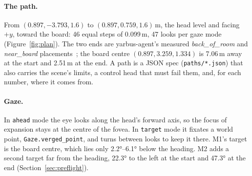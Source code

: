 \documentclass[11pt,a4paper]{article}
\newcommand{\code}[1]{\texttt{\small #1}}
\begin{document}
\paragraph{The path.} From $(0.897,-3.793,1.6)$ to $(0.897,0.759,1.6)$\,m, the head level and facing $+y$, toward the
board: 46 equal steps of 0.099\,m, 47 looks per gaze mode (Figure~\ref{fig:plan}). The two ends are yarbus-agent's
measured \emph{back\_of\_room} and \emph{near\_board} placements~\cite{yarbus}; the board centre $(0.897,3.259,1.334)$ is
7.06\,m away at the start and 2.51\,m at the end. A path is a JSON spec (\code{paths/*.json}) that also carries the
scene's limits, a control head that must fail them, and, for each number, where it comes from.

\paragraph{Gaze.} In \code{ahead} mode the eye looks along the head's forward axis, so the focus of expansion stays at the
centre of the fovea. In \code{target} mode it fixates a world point, \code{Gaze.verged\_point}, and turns between looks
to keep it there. M1's target is the board centre, which lies only 2.2°--6.1° below the heading. M2 adds a second target
far from the heading, 22.3° to the left at the start and 47.3° at the end (Section~\ref{sec:preflight}).
\end{document}
